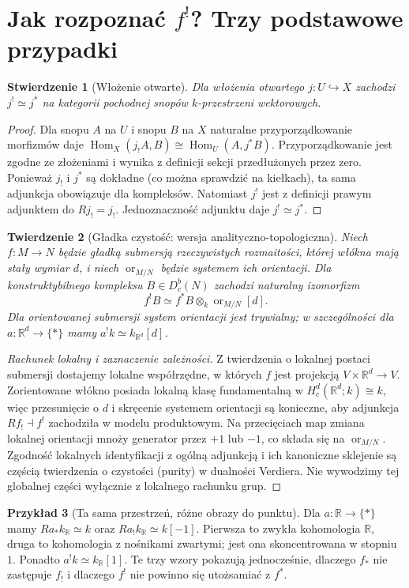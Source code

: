 \documentclass[11pt,a4paper,oneside]{report}
\newcommand{\R}{\mathbb{R}}
\theoremstyle{plain}
\newtheorem{twierdzenie}{Twierdzenie}[section]
\newtheorem{stwierdzenie}[twierdzenie]{Stwierdzenie}
\theoremstyle{definition}
\newtheorem{przyklad}[twierdzenie]{Przykład}
\theoremstyle{remark}
\begin{document}
\section{Jak rozpoznać $f^!$? Trzy podstawowe przypadki}
\begin{stwierdzenie}[Włożenie otwarte]
\label{prop:xvi-open-shriek}
Dla włożenia otwartego $j:U\hookrightarrow X$ zachodzi
$j^!\simeq j^*$ na kategorii pochodnej snopów $k$-przestrzeni
wektorowych.
\end{stwierdzenie}
\begin{proof}
Dla snopu $A$ na $U$ i snopu $B$ na $X$ naturalne
przyporządkowanie morfizmów daje
$\operatorname{Hom}_X(j_!A,B)\cong
\operatorname{Hom}_U(A,j^*B)$.
Przyporządkowanie jest zgodne ze złożeniami i wynika
z definicji sekcji przedłużonych przez zero.
Ponieważ $j_!$ i $j^*$ są dokładne (co można sprawdzić
na kiełkach), ta sama adjunkcja obowiązuje dla kompleksów.
Natomiast $j^!$ jest z definicji prawym adjunktem do $Rj_!=j_!$.
Jednoznaczność adjunktu daje $j^!\simeq j^*$.
\end{proof}

\begin{twierdzenie}[Gładka czystość: wersja analityczno-topologiczna]
\label{thm:xvi-smooth-purity}
Niech $f:M\to N$ będzie gładką submersją rzeczywistych
rozmaitości, której włókna mają stały wymiar $d$, i niech
$\operatorname{or}_{M/N}$ będzie systemem ich orientacji.
Dla konstruktybilnego kompleksu $B\in D^b_c(N)$ zachodzi
naturalny izomorfizm
\[
 f^!B\simeq f^*B\otimes_k\operatorname{or}_{M/N}[d].
\]
Dla orientowanej submersji system orientacji jest trywialny;
w szczególności dla $a:\R^d\to\{*\}$ mamy
$a^!k\simeq k_{\R^d}[d]$.
\end{twierdzenie}
\begin{proof}[Rachunek lokalny i zaznaczenie zależności]
Z twierdzenia o lokalnej postaci submersji dostajemy
lokalne współrzędne, w których $f$ jest projekcją
$V\times\R^d\to V$. Zorientowane włókno posiada lokalną
klasę fundamentalną w
$H_c^d(\R^d;k)\cong k$, więc przesunięcie o $d$
i skręcenie systemem orientacji są konieczne, aby
adjunkcja $Rf_!\dashv f^!$ zachodziła w modelu
produktowym. Na przecięciach map zmiana lokalnej
orientacji mnoży generator przez $+1$ lub $-1$,
co składa się na $\operatorname{or}_{M/N}$.
Zgodność lokalnych identyfikacji z ogólną adjunkcją i
ich kanoniczne sklejenie są częścią twierdzenia o
czystości (purity) w dualności Verdiera. Nie wywodzimy
tej globalnej części wyłącznie z lokalnego rachunku grup.
\end{proof}
\begin{przyklad}[Ta sama przestrzeń, różne obrazy do punktu]
Dla $a:\R\to\{*\}$ mamy
$Ra_*k_{\R}\simeq k$ oraz $Ra_!k_{\R}\simeq k[-1]$.
Pierwsza to zwykła kohomologia $\R$, druga to
kohomologia z nośnikami zwartymi; jest ona skoncentrowana
w stopniu $1$. Ponadto $a^!k\simeq k_{\R}[1]$.
Te trzy wzory pokazują jednocześnie, dlaczego
$f_*$ nie zastępuje $f_!$ i dlaczego $f^!$
nie powinno się utożsamiać z $f^*$.
\end{przyklad}
\end{document}
